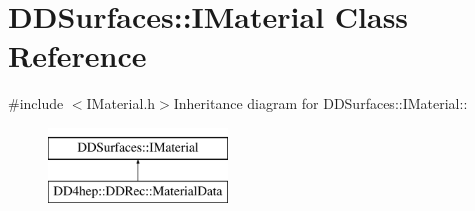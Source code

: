 \hypertarget{class_d_d_surfaces_1_1_i_material}{
\section{DDSurfaces::IMaterial Class Reference}
\label{class_d_d_surfaces_1_1_i_material}
}


{\ttfamily \#include $<$IMaterial.h$>$}Inheritance diagram for DDSurfaces::IMaterial::\begin{figure}[H]
\begin{center}
\leavevmode
\includegraphics[height=2cm]{class_d_d_surfaces_1_1_i_material}
\end{center}
\end{figure}
